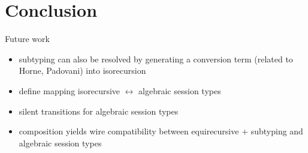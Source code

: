 
\section{Conclusion}
\label{sec:conclusion}

Future work
\begin{itemize}
\item subtyping can also be resolved by generating a conversion term (related to Horne, Padovani) into isorecursion
\item define mapping isorecursive $\leftrightarrow$ algebraic session types
\item silent transitions for algebraic session types
\item composition yields wire compatibility between equirecursive + subtyping and algebraic session types
\end{itemize}


